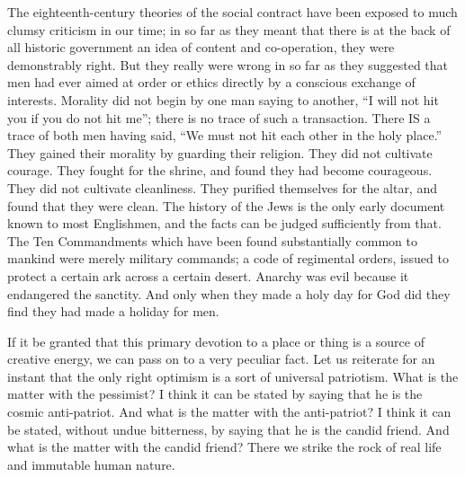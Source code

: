 The eighteenth-century theories of the social contract have been exposed to much clumsy criticism in our time; in so far as they meant that there is at the back of all historic government an idea of content and co-operation, they were demonstrably right. But they really were wrong in so far as they suggested that men had ever aimed at order or ethics directly by a conscious exchange of interests. Morality did not begin by one man saying to another, “I will not hit you if you do not hit me”; there is no trace of such a transaction. There IS a trace of both men having said, “We must not hit each other in the holy place.” They gained their morality by guarding their religion. They did not cultivate courage. They fought for the shrine, and found they had become courageous. They did not cultivate cleanliness. They purified themselves for the altar, and found that they were clean. The history of the Jews is the only early document known to most Englishmen, and the facts can be judged sufficiently from that. The Ten Commandments which have been found substantially common to mankind were merely military commands; a code of regimental orders, issued to protect a certain ark across a certain desert. Anarchy was evil because it endangered the sanctity. And only when they made a holy day for God did they find they had made a holiday for men.

If it be granted that this primary devotion to a place or thing is a source of creative energy, we can pass on to a very peculiar fact. Let us reiterate for an instant that the only right optimism is a sort of universal patriotism. What is the matter with the pessimist? I think it can be stated by saying that he is the cosmic anti-patriot. And what is the matter with the anti-patriot? I think it can be stated, without undue bitterness, by saying that he is the candid friend. And what is the matter with the candid friend? There we strike the rock of real life and immutable human nature.

